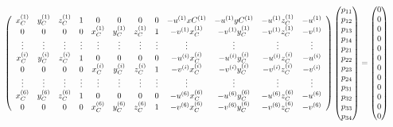 
\[
\resizebox{\textwidth}{!}{$
\left(
\begin{array}{cccccccccccc}
    x_{C}^{(1)} & y_{C}^{(1)} & z_{C}^{(1)} & 1 & 0 & 0 & 0 & 0 & -u^{( 1)} x{C}^{(1)} & -u^{( 1)}y{C}^{(1)} & -u^{( 1)}z_{C}^{(1)} & -u^{(1)}\\
0 & 0 & 0 & 0 & x_{C}^{( 1)} & y_{C}^{( 1)} & z_{C}^{( 1)} & 1 & -v^{( 1)} x_{C}^{( 1)} & -v^{( 1)} y_{C}^{( 1)} & -v^{( 1)} z_{C}^{( 1)} & -v^{( 1)}\\
\vdots  & \vdots  & \vdots  & \vdots  & \vdots  & \vdots  & \vdots  & \vdots  & \vdots  & \vdots  & \vdots  & \vdots \\
x_{C}^{( i)} & y_{C}^{( i)} & z_{C}^{( i)} & 1 & 0 & 0 & 0 & 0 & -u^{( i)} x_{C}^{( i)} & -u^{( i)} y_{C}^{( i)} & -u^{( i)} z_{C}^{( i)} & -u^{( i)}\\
0 & 0 & 0 & 0 & x_{C}^{( i)} & y_{C}^{( i)} & z_{C}^{( i)} & 1 & -v^{( i)} x_{C}^{( i)} & -v^{( i)} y_{C}^{( i)} & -v^{( i)} z_{C}^{( i)} & -v^{( i)}\\
\vdots  & \vdots  & \vdots  & \vdots  & \vdots  & \vdots  & \vdots  & \vdots  & \vdots  & \vdots  & \vdots  & \vdots \\
x_{C}^{( 6)} & y_{C}^{( 6)} & z_{C}^{( 6)} & 1 & 0 & 0 & 0 & 0 & -u^{( 6)} x_{C}^{( 6)} & -u^{( 6)} y_{C}^{( 6)} & -u^{( 6)} z_{C}^{( 6)} & -u^{( 6)}\\
0 & 0 & 0 & 0 & x_{C}^{( 6)} & y_{C}^{( 6)} & z_{C}^{( 6)} & 1 & -v^{( 6)} x_{C}^{( 6)} & -v^{( 6)} y_{C}^{( 6)} & -v^{( 6)} z_{C}^{( 6)} & -v^{( 6)}
\end{array}
\right)
\begin{pmatrix}
p_{11}\\
p_{12}\\
p_{13}\\
p_{14}\\
p_{21}\\
p_{22}\\
p_{23}\\
p_{24}\\
p_{31}\\
p_{32}\\
p_{33}\\
p_{34}
\end{pmatrix} =\begin{pmatrix}
0\\
0\\
0\\
0\\
0\\
0\\
0\\
0\\
0\\
0\\
0\\
0
\end{pmatrix}
$}
\]